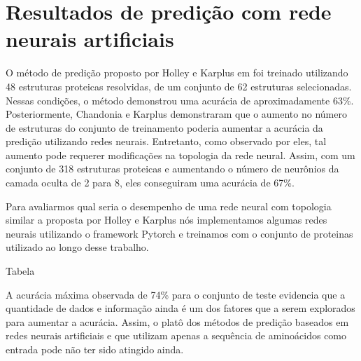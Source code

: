 \section{Resultados de predição com rede neurais artificiais}

O método de predição proposto por Holley e Karplus em \citeyear{key} foi treinado utilizando 48 estruturas proteicas resolvidas, de um conjunto de 62 estruturas selecionadas. Nessas condições, o método demonstrou uma acurácia de aproximadamente 63\%. Posteriormente, Chandonia e Karplus \citeyear{10.1002/pro.5560050422} demonstraram que o aumento no número de estruturas do conjunto de treinamento poderia aumentar a acurácia da predição utilizando redes neurais. Entretanto, como observado por eles, tal aumento pode requerer modificações na topologia da rede neural. Assim, com um conjunto de 318 estruturas proteicas e aumentando o número de neurônios da camada oculta de 2 para 8, eles conseguiram uma acurácia de 67\%.

Para avaliarmos qual seria o desempenho de uma rede neural com topologia similar a proposta por Holley e Karplus \citeyear{key} nós implementamos algumas redes neurais utilizando o framework Pytorch e treinamos com o conjunto de proteinas utilizado ao longo desse trabalho.

Tabela 



A acurácia máxima observada de 74\% para o conjunto de teste evidencia que a quantidade de dados e informação ainda é um dos fatores que a serem explorados para aumentar a acurácia. Assim, o platô dos métodos de predição baseados em redes neurais artificiais e que utilizam apenas a sequência de aminoácidos como entrada pode não ter sido atingido ainda.





